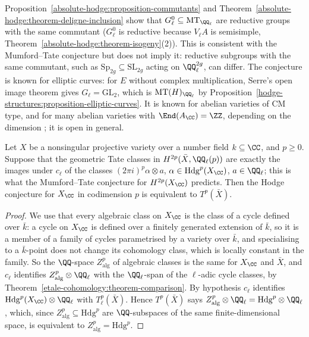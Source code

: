 \begin{remark}\label{absolute-hodge:remark-mumford-tate-known}
Proposition~\ref{absolute-hodge:proposition-commutants} and Theorem~\ref{absolute-hodge:theorem-deligne-inclusion} show that $G_\ell^0 \subseteq \mathrm{MT}_{\QQ_\ell}$ are reductive groups with the same
commutant ($G_\ell^0$ is reductive because $V_\ell A$ is semisimple, Theorem~\ref{absolute-hodge:theorem-isogeny}(2)). This is consistent with the Mumford--Tate conjecture but does not imply it:
reductive subgroups with the same commutant, such as $\mathrm{Sp}_{2g} \subseteq \mathrm{SL}_{2g}$ acting on $\QQ_\ell^{2g}$, can differ. The conjecture is known for elliptic curves: for $E$ without complex
multiplication, Serre's open image theorem \cite{serre-1972} gives $G_\ell = \mathrm{GL}_2$, which is $\mathrm{MT}(H)_{\QQ_\ell}$ by Proposition~\ref{hodge-structures:proposition-elliptic-curves}. It is known for
abelian varieties of CM type, and for many abelian varieties with $\End(A_\CC) = \ZZ$, depending on the dimension \cite{pink-1998}; it is open in general.
\end{remark}

\begin{proposition}\label{absolute-hodge:proposition-hodge-tate}
Let $X$ be a nonsingular projective variety over a number field $k \subseteq \CC$, and $p \geq 0$. Suppose that the geometric Tate classes in $H^{2p}(\bar X, \QQ_\ell(p))$ are exactly the images under $c_\ell$
of the classes $(2\pi i)^p\alpha \otimes a$, $\alpha \in \mathrm{Hdg}^p(X_\CC)$, $a \in \QQ_\ell$; this is what the Mumford--Tate conjecture for $H^{2p}(X_\CC)$ predicts. Then the Hodge conjecture for $X_\CC$
in codimension $p$ is equivalent to $T^p(\bar X)$.
\end{proposition}

\begin{proof}
We use that every algebraic class on $X_\CC$ is the class of a cycle defined over $\bar k$: a cycle on $X_\CC$ is defined over a finitely generated extension of $\bar k$, so it is a member of a family of cycles
parametrised by a variety over $\bar k$, and specialising to a $\bar k$-point does not change its cohomology class, which is locally constant in the family. So the $\QQ$-space $Z^p_{\mathrm{alg}}$ of algebraic
classes is the same for $X_\CC$ and $\bar X$, and $c_\ell$ identifies $Z^p_{\mathrm{alg}} \otimes \QQ_\ell$ with the $\QQ_\ell$-span of the $\ell$-adic cycle classes, by Theorem~\ref{etale-cohomology:theorem-comparison}.
By hypothesis $c_\ell$ identifies $\mathrm{Hdg}^p(X_\CC) \otimes \QQ_\ell$ with $T^p_\ell(\bar X)$. Hence $T^p(\bar X)$ says $Z^p_{\mathrm{alg}} \otimes \QQ_\ell = \mathrm{Hdg}^p \otimes \QQ_\ell$, which, since
$Z^p_{\mathrm{alg}} \subseteq \mathrm{Hdg}^p$ are $\QQ$-subspaces of the same finite-dimensional space, is equivalent to $Z^p_{\mathrm{alg}} = \mathrm{Hdg}^p$.
\end{proof}

